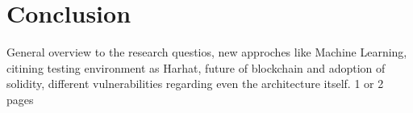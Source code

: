 
\chapter{Conclusion}
\label{ch:Conclusion}
General overview to the research questios, new approches like Machine Learning, citining testing environment as Harhat, 
future of blockchain and adoption of solidity, different vulnerabilities regarding even the architecture itself. 
1 or 2 pages